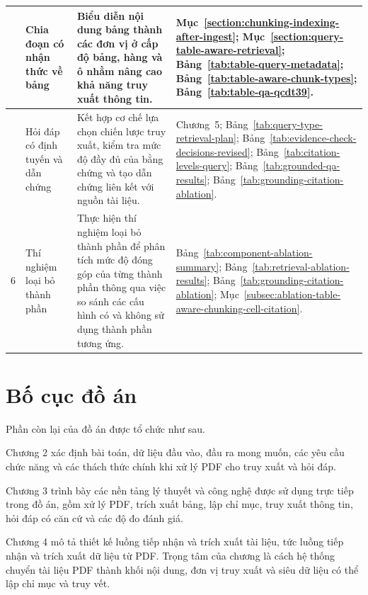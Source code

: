 \documentclass[../DoAn.tex]{subfiles}
\begin{document}
\begin{table}[H]
\begin{tabularx}{\textwidth}{
    |>{\centering\arraybackslash}p{}
    |>{\raggedright\arraybackslash}p{}
    |>{\raggedright\arraybackslash}X
    |>{\raggedright\arraybackslash}p{}|
}
    4
    & Chia đoạn có nhận thức về bảng
    & Biểu diễn nội dung bảng thành các đơn vị ở cấp độ bảng, hàng và ô
    nhằm nâng cao khả năng truy xuất thông tin.
    & Mục~\ref{section:chunking-indexing-after-ingest}; Mục~\ref{section:query-table-aware-retrieval}; Bảng~\ref{tab:table-query-metadata}; Bảng~\ref{tab:table-aware-chunk-types}; Bảng~\ref{tab:table-qa-qcdt39}. \\
    \hline

    5
    & Hỏi đáp có định tuyến và dẫn chứng
    & Kết hợp cơ chế lựa chọn chiến lược truy xuất, kiểm tra mức độ đầy đủ
    của bằng chứng và tạo dẫn chứng liên kết với nguồn tài liệu.
    & Chương~5; Bảng~\ref{tab:query-type-retrieval-plan}; Bảng~\ref{tab:evidence-check-decisions-revised}; Bảng~\ref{tab:citation-levels-query}; Bảng~\ref{tab:grounded-qa-results}; Bảng~\ref{tab:grounding-citation-ablation}. \\
    \hline

    6
    & Thí nghiệm loại bỏ thành phần
    & Thực hiện thí nghiệm loại bỏ thành phần để
    phân tích mức độ đóng góp của từng thành phần thông qua việc so sánh
    các cấu hình có và không sử dụng thành phần tương ứng.
    & Bảng~\ref{tab:component-ablation-summary}; Bảng~\ref{tab:retrieval-ablation-results}; Bảng~\ref{tab:grounding-citation-ablation}; Mục~\ref{subsec:ablation-table-aware-chunking-cell-citation}. \\
    \hline

\end{tabularx}


\end{table}




\section{Bố cục đồ án}



Phần còn lại của đồ án được tổ chức như sau.

Chương 2 xác định bài toán, dữ liệu đầu vào, đầu ra mong muốn, các yêu cầu chức năng và các thách thức chính khi xử lý PDF cho truy xuất và hỏi đáp.

Chương 3 trình bày các nền tảng lý thuyết và công nghệ được sử dụng trực tiếp trong đồ án, gồm xử lý PDF, trích xuất bảng, lập chỉ mục, truy xuất thông tin, hỏi đáp có căn cứ và các độ đo đánh giá.

Chương 4 mô tả thiết kế luồng tiếp nhận và trích xuất tài liệu, tức luồng tiếp nhận và trích xuất dữ liệu từ PDF. Trọng tâm của chương là cách hệ thống chuyển tài liệu PDF thành khối nội dung, đơn vị truy xuất và siêu dữ liệu có thể lập chỉ mục và truy vết.
\end{document}
